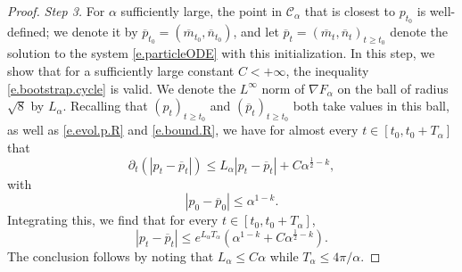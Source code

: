 \documentclass[10pt,a4paper]{amsart}
\newcommand{\Ll}{\left}
\newcommand{\Rr}{\right}
\newcommand{\al}{\alpha}
\newcommand{\dr}{\partial}
\newcommand{\msc}{\mathscr}
\renewcommand{\bar}{\overline}
\renewcommand{\ge}{\geqslant}
\renewcommand{\le}{\leqslant}
\begin{document}
\begin{proof}
\medskip


\noindent \emph{Step 3.} For $\alpha$ sufficiently large, the point in $\msc C_\al$ that is closest to $p_{t_0}$ is well-defined; we denote it by $\bar p_{t_0} = (\bar m_{t_0}, \bar n_{t_0})$, and let $\bar p_t = (\bar m_t, \bar n_t)_{t \ge t_0}$ denote the solution to the system \eqref{e.particleODE} with this initialization. In this step, we show that for a sufficiently large constant $C < +\infty$, the inequality \eqref{e.bootstrap.cycle} is valid. We denote the $L^\infty$ norm of $\nabla F_\al$ on the ball of radius $\sqrt{8}$ by $L_\al$. Recalling that $(p_t)_{t \ge t_0}$ and $(\bar p_t)_{t \ge t_0}$ both take values in this ball, as well as \eqref{e.evol.p.R} and \eqref{e.bound.R}, we have for almost every $t \in [t_0, t_0 + T_\al]$ that
\begin{equation*}  %
\dr_t \Ll(|p_t - \bar p_t|\Rr) \le L_\al |p_t - \bar p_t| + C \al^{\frac 1 2 - k},
\end{equation*}
with
\begin{equation*}  %
|p_0 -\bar p_0| \le \al^{1-k}.
\end{equation*}
Integrating this, we find that for every $t \in [t_0, t_0 + T_\al]$,
\begin{equation*}  %
|p_t -\bar p_t| \le e^{L_\al T_\al} \Ll(\al^{1-k} + C \al^{\frac 1 2 - k}\Rr) .
\end{equation*}
The conclusion follows by noting that $L_\al \le C \al$ while $T_\al \le 4\pi/\al$. 


\medskip


\end{proof}
\end{document}

